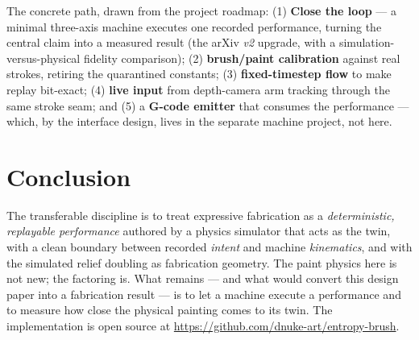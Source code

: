 \documentclass[11pt]{article}
\begin{document}
The concrete path, drawn from the project roadmap:
(1) \textbf{Close the loop} --- a minimal three-axis machine executes one recorded
performance, turning the central claim into a measured result (the arXiv \emph{v2}
upgrade, with a simulation-versus-physical fidelity comparison);
(2) \textbf{brush/paint calibration} against real strokes, retiring the
quarantined constants;
(3) \textbf{fixed-timestep flow} to make replay bit-exact;
(4) \textbf{live input} from depth-camera arm tracking through the same stroke
seam; and
(5) a \textbf{G-code emitter} that consumes the performance --- which, by the
interface design, lives in the separate machine project, not here.

\section{Conclusion}

The transferable discipline is to treat expressive fabrication as a
\emph{deterministic, replayable performance} authored by a physics simulator that
acts as the twin, with a clean boundary between recorded \emph{intent} and machine
\emph{kinematics}, and with the simulated relief doubling as fabrication geometry.
The paint physics here is not new; the factoring is. What remains --- and what
would convert this design paper into a fabrication result --- is to let a machine
execute a performance and to measure how close the physical painting comes to its
twin. The implementation is open source at
\url{https://github.com/dnuke-art/entropy-brush}.



\end{document}
